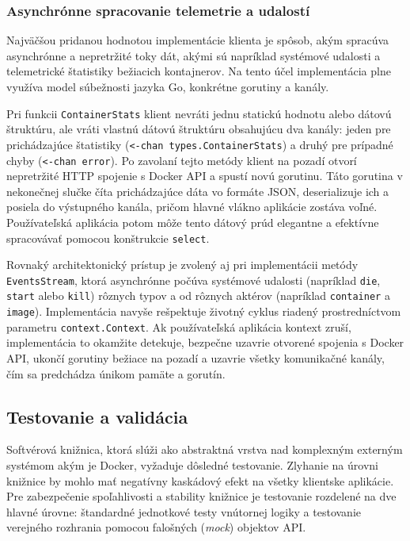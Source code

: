 \documentclass[
 program=infpvs,
  language=slovak,
  figures=false,
  tables=false,
  sourcecodes,
  glossaries,
  index
]{kidiplom}
\begin{document}
{\subsubsection{Asynchrónne spracovanie telemetrie a udalostí}  \label{sec:telemetria-events}
Najväčšou pridanou hodnotou implementácie klienta je spôsob, akým spracúva asynchrónne a nepretržité toky dát, akými sú napríklad systémové udalosti a telemetrické štatistiky bežiacich kontajnerov. Na tento účel implementácia plne využíva model súbežnosti jazyka Go, konkrétne gorutiny a kanály.

Pri funkcii \texttt{ContainerStats} klient nevráti jednu statickú hodnotu alebo dátovú štruktúru, ale vráti vlastnú dátovú štruktúru obsahujúcu dva kanály: jeden pre prichádzajúce štatistiky (\texttt{<-chan types.ContainerStats}) a druhý pre prípadné chyby (\texttt{<-chan error}). Po zavolaní tejto metódy klient na pozadí otvorí nepretržité HTTP spojenie s Docker API a spustí novú gorutinu. Táto gorutina v nekonečnej slučke číta prichádzajúce dáta vo formáte JSON, deserializuje ich a posiela do výstupného kanála, pričom hlavné vlákno aplikácie zostáva voľné. Používateľská aplikácia potom môže tento dátový prúd elegantne a efektívne spracovávať pomocou konštrukcie \texttt{select}.

Rovnaký architektonický prístup je zvolený aj pri implementácii metódy \texttt{EventsStream}, ktorá asynchrónne počúva systémové udalosti (napríklad \texttt{die}, \texttt{start} alebo \texttt{kill}) rôznych typov a od rôznych aktérov (napríklad \texttt{container} a \texttt{image}). Implementácia navyše rešpektuje životný cyklus riadený prostredníctvom parametru \texttt{context.Context}. Ak používateľská aplikácia kontext zruší, implementácia to okamžite detekuje, bezpečne uzavrie otvorené spojenia s Docker API, ukončí gorutiny bežiace na pozadí a uzavrie všetky komunikačné kanály, čím sa predchádza únikom pamäte a gorutín.



\subsection{Testovanie a validácia}  \label{sec:testovanie}
Softvérová knižnica, ktorá slúži ako abstraktná vrstva nad komplexným externým systémom akým je Docker, vyžaduje dôsledné testovanie. Zlyhanie na úrovni knižnice by mohlo mať negatívny kaskádový efekt na všetky klientske aplikácie. Pre zabezpečenie spoľahlivosti a stability knižnice je testovanie rozdelené na dve hlavné úrovne: štandardné jednotkové testy vnútornej logiky a testovanie verejného rozhrania pomocou falošných (\textit{mock}) objektov API.



}
\end{document}
